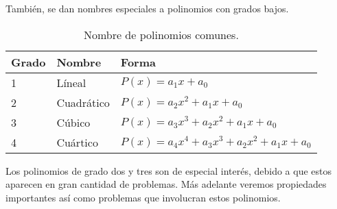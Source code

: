 También, se dan nombres especiales a polinomios con grados bajos.
\begin{table}[H]
    \centering
    \begin{tabular}{p{1.5cm} p{2.5cm} p{6.5cm}}
        \hline
        Grado & Nombre & Forma \\
        \hline \hline
        1 & Líneal & $P(x) = a_1 x + a_0$\\
        2 & Cuadrático & $P(x) = a_2 x^2 + a_1 x + a_0$\\
        3 & Cúbico & $P(x) = a_3 x^3 + a_2 x^2 + a_1 x + a_0$\\
        4 & Cuártico & $P(x) = a_4 x^4 + a_3 x^3 + a_2 x^2 + a_1 x + a_0$\\
        \hline
    \end{tabular}
    \caption{Nombre de polinomios comunes.}
\end{table}
Los polinomios de grado dos y tres son de especial interés, debido a que estos aparecen en gran cantidad de problemas.
Más adelante veremos propiedades importantes así como problemas que involucran estos polinomios.

